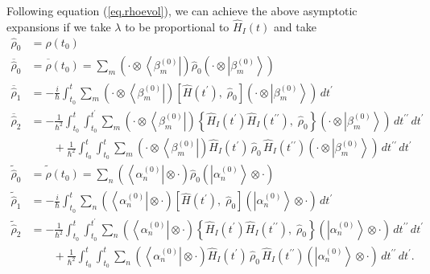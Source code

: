 \documentclass[11pt]{article}
\newcommand{\bra}[1]{\left\langle#1\right|}
\newcommand{\ket}[1]{\left|#1\right\rangle}
\newcommand{\op}[1]{\hat{#1}}
\theoremstyle{theorem}
\theoremstyle{remark}
\theoremstyle{step}
\theoremstyle{gap}
\begin{document}
Following equation (\ref{eq.rhoevol}), we can achieve the above asymptotic expansions if we take \(\lambda\) to be proportional to \(\op{H}_I(t)\) and take
\begin{align}
\nonumber\op{\rho}_0 &= \op{\rho}\left(t_0\right) \\
\nonumber\overline{\op{\rho}}_0 &= \overline{\op{\rho}}\left(t_0\right) =  \sum_m \left(\cdot\otimes\bra{\beta_m^{(0)}}\right) \op{\rho}_0 \left(\cdot\otimes\ket{\beta_m^{(0)}}\right) \\
\label{eq.rho1red}\overline{\op{\rho}}_1 &= -\frac{i}{\hbar} \int_{t_0}^t \sum_m \left(\cdot\otimes\bra{\beta_m^{(0)}}\right) \left[\op{H}(t^\prime),\; \op{\rho}_0 \right]\left(\cdot\otimes\ket{\beta_m^{(0)}}\right) \,dt^\prime\\
\label{eq.rho2red}\overline{\op{\rho}}_2 &= - \frac{1}{\hbar^2} \int_{t_0}^t \int_{t_0}^{t^\prime} \sum_m \left(\cdot\otimes\bra{\beta_m^{(0)}}\right) \left\{ \op{H}_I (t^\prime) \op{H}_I(t^{\prime\prime}),\; \op{\rho}_0 \right\}\left(\cdot\otimes\ket{\beta_m^{(0)}}\right)\,dt^{\prime\prime}\,dt^\prime \\
\nonumber&\hspace{2em}+ \frac{1}{\hbar^2} \int_{t_0}^t \int_{t_0}^{t} \sum_m \left(\cdot\otimes\bra{\beta_m^{(0)}}\right) \op{H}_I (t^\prime) \,\op{\rho}_0\, \op{H}_I (t^{\prime\prime})\left(\cdot\otimes\ket{\beta_m^{(0)}}\right)\,dt^{\prime\prime}\,dt^\prime \\
\nonumber\widetilde{\op{\rho}}_0 &= \widetilde{\op{\rho}}\left(t_0\right) =  \sum_n \left(\bra{\alpha_n^{(0)}}\otimes\cdot\right) \op{\rho}_0 \left(\ket{\alpha_n^{(0)}}\otimes\cdot\right) \\
\nonumber\widetilde{\op{\rho}}_1 &= -\frac{i}{\hbar} \int_{t_0}^t \sum_n \left(\bra{\alpha_n^{(0)}}\otimes\cdot\right) \left[\op{H}(t^\prime),\; \op{\rho}_0 \right]\left(\ket{\alpha_n^{(0)}}\otimes\cdot\right) \,dt^\prime\\
\nonumber\widetilde{\op{\rho}}_2 &= - \frac{1}{\hbar^2} \int_{t_0}^t \int_{t_0}^{t^\prime} \sum_n \left(\bra{\alpha_n^{(0)}}\otimes\cdot\right) \left\{ \op{H}_I (t^\prime) \op{H}_I(t^{\prime\prime}),\; \op{\rho}_0 \right\}\left(\ket{\alpha_n^{(0)}}\otimes\cdot\right)\,dt^{\prime\prime}\,dt^\prime \\
\nonumber&\hspace{2em}+ \frac{1}{\hbar^2} \int_{t_0}^t \int_{t_0}^{t} \sum_n \left(\bra{\alpha_n^{(0)}}\otimes\cdot\right) \op{H}_I (t^\prime) \,\op{\rho}_0\, \op{H}_I (t^{\prime\prime})\left(\ket{\alpha_n^{(0)}}\otimes\cdot\right)\,dt^{\prime\prime}\,dt^\prime.
\end{align}
\end{document}
